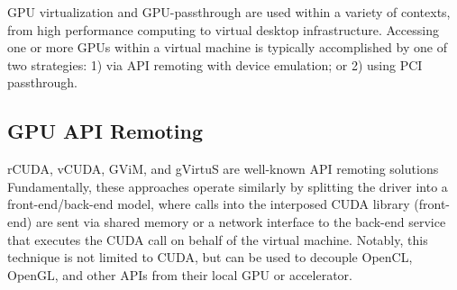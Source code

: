 GPU virtualization and GPU-passthrough are used within a variety of contexts,
from high performance computing to virtual desktop infrastructure.  Accessing one or
more GPUs within a virtual machine is typically accomplished by one of two
strategies: 1) via API remoting with device emulation; or 2) using PCI
passthrough.  


\subsection {GPU API Remoting}

rCUDA, vCUDA, GViM, and gVirtuS are well-known API
remoting solutions%
Fundamentally, these approaches operate similarly by splitting the driver into a
front-end/back-end model, where calls into the interposed CUDA library
(front-end)  are sent via shared memory or a network interface to the back-end
service that executes the CUDA call on behalf of the virtual machine.  Notably,
this technique is not limited to CUDA, but can be used to decouple OpenCL,
OpenGL, and other APIs from their local GPU or accelerator. 



